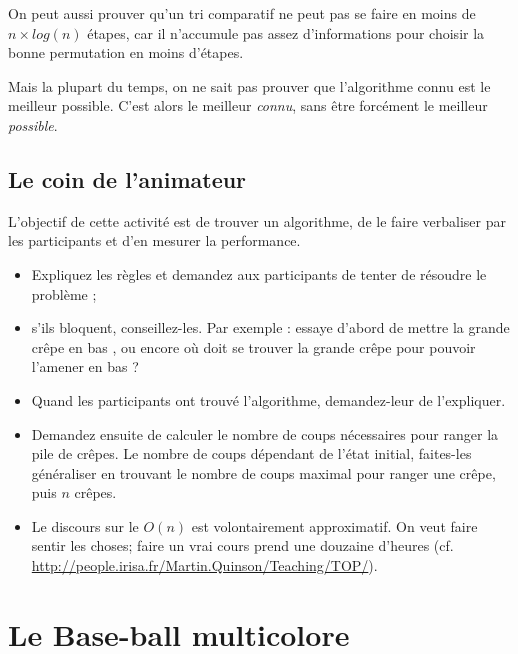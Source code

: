 \documentclass[a5paper,pagesize,DIV=14]{scrbook}
\begin{document}
On peut aussi prouver qu'un tri comparatif ne peut pas se faire en moins de
$n\times log(n)$ étapes, car il n'accumule pas assez d'informations pour choisir
la bonne permutation en moins d'étapes.

Mais la plupart du temps, on ne sait pas prouver que l'algorithme connu est le
meilleur possible. C'est alors le meilleur \textit{connu}, sans être forcément
le meilleur \textit{possible}.
    
\section*{Le coin de l'animateur}

L'objectif de cette activité est de trouver un algorithme, de le faire
verbaliser par les participants et d'en mesurer la performance.

\begin{itemize}
\item Expliquez les règles et demandez aux participants de tenter de résoudre le
  problème ;
\item s'ils bloquent, conseillez-les. Par exemple : \og essaye d'abord de mettre
  la grande crêpe en bas \fg, ou encore \og où doit se trouver la grande crêpe
  pour pouvoir l'amener en bas ? \fg
\item Quand les participants ont trouvé l'algorithme, demandez-leur de
  l'expliquer.
\item Demandez ensuite de calculer le nombre de coups nécessaires pour ranger la
  pile de crêpes. Le nombre de coups dépendant de l'état initial, faites-les
  généraliser en trouvant le nombre de coups maximal pour ranger une crêpe, puis
  $n$ crêpes.
\item Le discours sur le $O(n)$ est volontairement approximatif. On veut faire
  sentir les choses; faire un vrai cours prend une douzaine d'heures
  (cf. \url{http://people.irisa.fr/Martin.Quinson/Teaching/TOP/}).




\end{itemize}
\chapter*{Le Base-ball multicolore}
\end{document}
